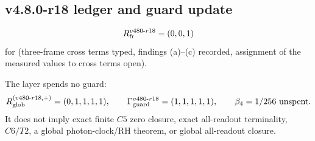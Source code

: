 \subsection*{v4.8.0-r18 ledger and guard update}
\label{subsec:v480-r18-ledger-guard}

\[
R_{\rm fr}^{v480\text{-}r18}=(0,0,1)
\]
for (three-frame cross terms typed, findings (a)--(c) recorded, assignment of the measured values to cross terms
open).

The layer spends no guard:
\[
R_{\rm glob}^{(v480\text{-}r18,+)}=(0,1,1,1,1),
\qquad
\Gamma_{\rm guard}^{v480\text{-}r18}=(1,1,1,1,1),
\qquad
\beta_4=1/256\ \text{unspent}.
\]
It does not imply exact finite \(C5\) zero closure, exact all-readout terminality,
\(C6/T2\), a global photon-clock/RH theorem, or global all-readout closure.


